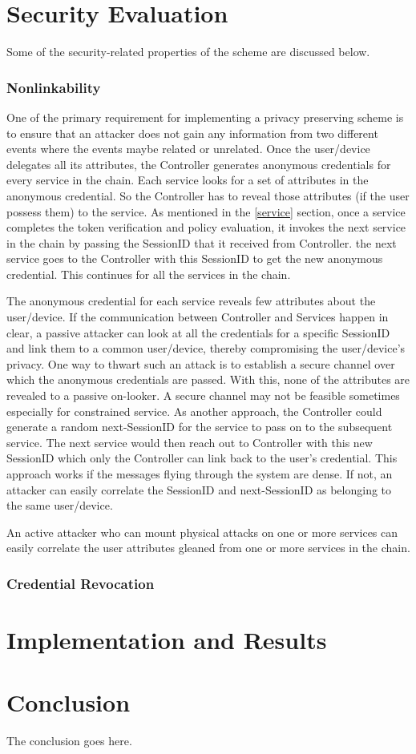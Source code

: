 \documentclass[journal]{IEEEtran}
\begin{document}
\section{Security Evaluation} \label{seceval}
Some of the security-related properties of the scheme are discussed below.
\subsubsection{Nonlinkability}
One of the primary requirement for implementing a privacy preserving scheme is to ensure that an attacker does not gain any information from two different events where the events maybe related or unrelated. Once the user/device delegates all its attributes, the Controller generates anonymous credentials for every service in the chain. Each service looks for a set of attributes in the anonymous credential. So the Controller has to reveal those attributes (if the user possess them) to the service. As mentioned in the \ref{service} section, once a service completes the token verification and policy evaluation, it invokes the next service in the chain by passing the SessionID that it received from Controller. the next service goes to the Controller with this SessionID to get the new anonymous credential. This continues for all the services in the chain.

The anonymous credential for each service reveals few attributes about the user/device. If the communication between Controller and Services happen in clear, a passive attacker can look at all the credentials for a specific SessionID and link them to a common user/device, thereby compromising the user/device's privacy. One way to thwart such an attack is to establish a secure channel over which the anonymous credentials are passed. With this, none of the attributes are revealed to a passive on-looker. A secure channel may not be feasible sometimes especially for constrained service. As another approach, the Controller could generate a random next-SessionID for the service to pass on to the subsequent service. The next service would then reach out to Controller with this new SessionID which only the Controller can link back to the user's credential. This approach works if the messages flying through the system are dense. If not, an attacker can easily correlate the SessionID and next-SessionID as belonging to the same user/device.

An active attacker who can mount physical attacks on one or more services can easily correlate the user attributes gleaned from one or more services in the chain.
 
\subsubsection{Credential Revocation}


\section{Implementation and Results} \label{implementation}


\section{Conclusion}
The conclusion goes here.



\end{document}
